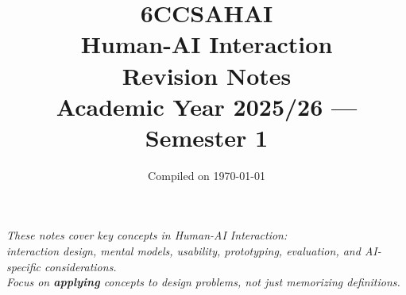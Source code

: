 \documentclass[10pt]{article}
\title{%
  \vspace{-1cm}
  {\LARGE\bfseries 6CCSAHAI}\\[0.3cm]
  {\Huge Human-AI Interaction}\\[0.5cm]
  {\Large Revision Notes}\\[0.3cm]
  {\large Academic Year 2025/26 --- Semester 1}
}
\author{}
\date{\vspace{-0.5cm}Compiled on \today}
\begin{document}
\maketitle
\thispagestyle{empty}

\vfill
\begin{center}
\textit{These notes cover key concepts in Human-AI Interaction:\\
interaction design, mental models, usability, prototyping, evaluation, and AI-specific considerations.\\[0.3cm]
Focus on \textbf{applying} concepts to design problems, not just memorizing definitions.}
\end{center}
\vfill

\clearpage
\tableofcontents

\clearpage



\clearpage


\clearpage


\clearpage


\clearpage


\clearpage



\clearpage


\clearpage


\clearpage


\clearpage

\end{document}
